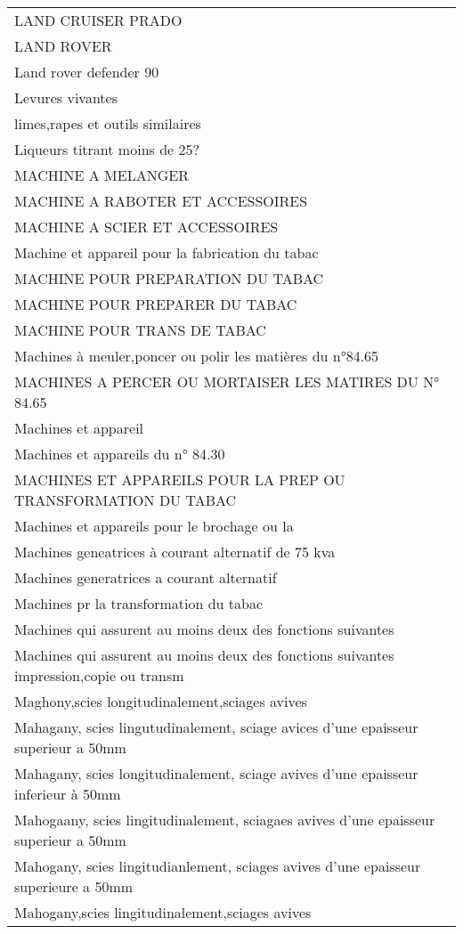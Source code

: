 \documentclass[
]{book}
\begin{document}
\begin{longtable}[t]{l}
LAND CRUISER PRADO\\
LAND ROVER\\
Land rover defender 90\\
\addlinespace
Levures vivantes\\
limes,rapes et outils similaires\\
Liqueurs titrant moins de 25?\\
MACHINE A MELANGER\\
MACHINE A RABOTER ET ACCESSOIRES\\
\addlinespace
MACHINE A SCIER ET ACCESSOIRES\\
Machine et appareil pour la fabrication du tabac\\
MACHINE POUR PREPARATION DU TABAC\\
MACHINE POUR PREPARER DU TABAC\\
MACHINE POUR TRANS DE TABAC\\
\addlinespace
Machines à meuler,poncer ou polir les matières du n°84.65\\
MACHINES A PERCER OU MORTAISER LES MATIRES DU N° 84.65\\
Machines et appareil\\
Machines et appareils du n° 84.30\\
MACHINES ET APPAREILS POUR LA PREP OU TRANSFORMATION DU TABAC\\
\addlinespace
Machines et appareils pour le brochage ou la\\
Machines geneatrices à courant alternatif de 75 kva\\
Machines generatrices a courant alternatif\\
Machines pr la transformation du tabac\\
Machines qui assurent au moins deux des fonctions suivantes\\
\addlinespace
Machines qui assurent au moins deux des fonctions suivantes impression,copie ou transm\\
Maghony,scies longitudinalement,sciages avives\\
Mahagany, scies lingutudinalement, sciage avices d'une epaisseur superieur a 50mm\\
Mahagany, scies longitudinalement, sciage avives d'une epaisseur inferieur à 50mm\\
Mahogaany, scies lingitudinalement, sciagaes avives d'une epaisseur superieur a 50mm\\
\addlinespace
Mahogany, scies lingitudianlement, sciages avives d'une epaisseur superieure a 50mm\\
Mahogany,scies lingitudinalement,sciages avives\\

\end{longtable}
\end{document}
